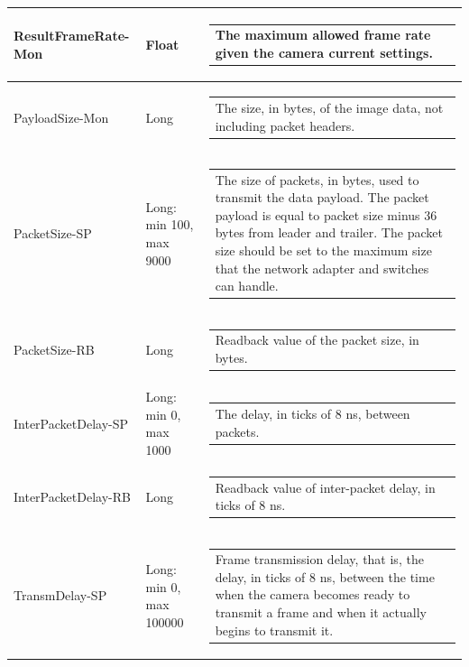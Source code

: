 \documentclass[openany]{article}
\begin{document}
\begin{longtable}{| m{3.0cm} m{4.5cm}  m{7.0cm} |}
        ResultFrameRate-Mon & Float & \begin{tabular}{@{}m{6cm}@{}}
                The maximum allowed frame rate given the camera current settings.
            \end{tabular} \hypertarget{pv:payload-size}{}\\ \hline
        PayloadSize-Mon & Long & \begin{tabular}{@{}m{6cm}@{}}
                The size, in bytes, of the image data, not including packet headers.
            \end{tabular} \hypertarget{pv:packet-size}{}\\ \hline
        PacketSize-SP & Long: min 100, max 9000 & \begin{tabular}{@{}m{6cm}@{}}
                The size of packets, in bytes, used to transmit the data payload. The packet payload is equal to packet size minus 36 bytes from leader and trailer. The packet size should be set to the maximum size that the network adapter and switches can handle.
            \end{tabular} \\ \hline
        PacketSize-RB & Long & \begin{tabular}{@{}m{6cm}@{}}
                Readback value of the packet size, in bytes.
            \end{tabular} \hypertarget{pv:inter-packet-delay}{}\\ \hline
        InterPacketDelay-SP & Long: min 0, max 1000 & \begin{tabular}{@{}m{6cm}@{}}
                The delay, in ticks of 8 ns, between packets.
            \end{tabular} \\ \hline
        InterPacketDelay-RB & Long & \begin{tabular}{@{}m{6cm}@{}}
                Readback value of inter-packet delay, in ticks of 8 ns.
            \end{tabular} \hypertarget{pv:transm-delay}{}\\ \hline
        TransmDelay-SP & Long: min 0, max 100000 & \begin{tabular}{@{}m{6cm}@{}}
                Frame transmission delay, that is, the delay, in ticks of 8 ns, between the time when the camera becomes ready to transmit a frame and when it actually begins to transmit it.
            \end{tabular} \\ \hline

\end{longtable}
\end{document}
